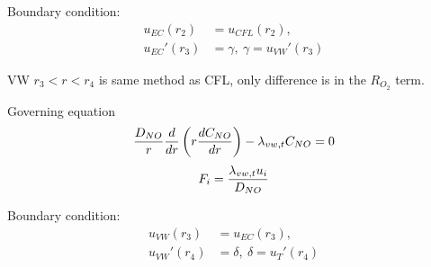 \documentclass[8pt, a4paper]{article}
\begin{document}
  Boundary condition:
  \begin{align*}
  u_{EC}(r_2)&=u_{CFL}(r_2),\\
  u_{EC}'(r_3)&=\gamma,\:\gamma=u_{VW}'(r_3)
  \end{align*}
  
  VW $r_3<r<r_4$ is same method as CFL, only difference is in the $R_{O_2}$ 
  term.
  
  Governing equation
  \begin{equation*}
  \frac{D_{NO}}{r}\frac{d}{dr}\left(r\frac{dC_{NO}}{dr}\right)-\lambda_{vw,t}C_{NO}=0
  \end{equation*}
  \begin{equation*}
  F_i=\frac{\lambda_{vw,t}u_i}{D_{NO}}
  \end{equation*}
  
  Boundary condition:
  \begin{align*}
  u_{VW}(r_3)&=u_{EC}(r_3),\\
  u_{VW}'(r_4)&=\delta,\:\delta=u_{T}'(r_4)
  \end{align*}
\end{document}

